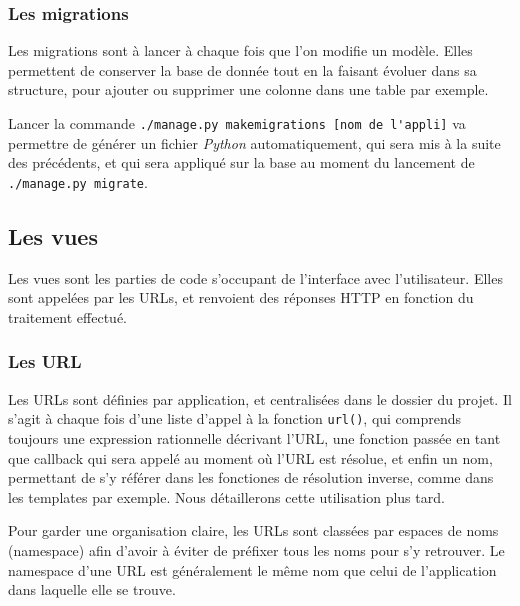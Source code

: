 \documentclass[a4paper]{report}
\begin{document}
\subsubsection{Les migrations}
\label{ssub:Les migrations}
\par Les migrations sont à lancer à chaque fois que l'on modifie un modèle. Elles permettent de conserver la base de
donnée tout en la faisant évoluer dans sa structure, pour ajouter ou supprimer une colonne dans une table par exemple.
\par Lancer la commande \verb#./manage.py makemigrations [nom de l'appli]# va permettre de générer un fichier \emph{Python}
automatiquement, qui sera mis à la suite des précédents, et qui sera appliqué sur la base au moment du lancement de
\verb#./manage.py migrate#.

\subsection{Les vues}
\label{sub:les_vues}
\par Les vues sont les parties de code s'occupant de l'interface avec l'utilisateur. Elles sont appelées par les URLs,
et renvoient des réponses HTTP en fonction du traitement effectué.

\subsubsection{Les URL}
\label{ssub:Les URL}
\par Les URLs sont définies par application, et centralisées dans le dossier du projet. Il s'agit à chaque fois d'une
liste d'appel à la fonction \verb#url()#, qui comprends toujours une expression rationnelle décrivant l'URL, une
fonction passée en tant que callback qui sera appelé au moment où l'URL est résolue, et enfin un nom, permettant de s'y
référer dans les fonctiones de résolution inverse, comme dans les templates par exemple. Nous détaillerons cette
utilisation plus tard.

\par Pour garder une organisation claire, les URLs sont classées par espaces de noms (namespace) afin d'avoir à éviter
de préfixer tous les noms pour s'y retrouver. Le namespace d'une URL est généralement le même nom que celui de
l'application dans laquelle elle se trouve.
\end{document}
